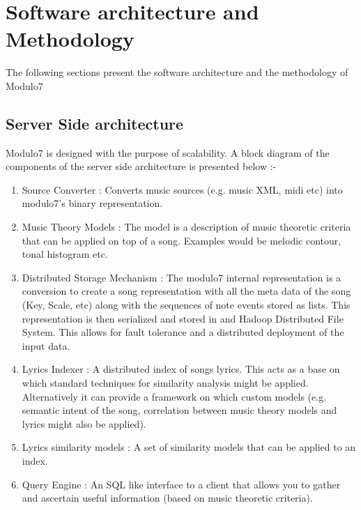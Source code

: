 \chapter{Software architecture and Methodology}
The following sections present the software architecture and the methodology of Modulo7
\section{Server Side architecture}
\noindent Modulo7 is designed with the purpose of scalability. A block diagram of the components of the server side architecture is presented below :-
\begin{enumerate}
\item Source Converter : Converts music sources (e.g. music XML, midi etc) into modulo7's binary representation.
\item Music Theory Models : The model is a description of music theoretic criteria that can be applied on top of a song. Examples would be melodic contour, tonal histogram etc. 
\item Distributed Storage Mechanism : The modulo7 internal representation is a conversion to create a song representation with all the meta data of the song (Key, Scale,  etc) along with the sequences of note events stored as lists. This representation is then serialized and stored in and Hadoop Distributed File System. This allows for fault tolerance and a distributed deployment of the input data.
\item Lyrics Indexer : A distributed index of songs lyrics. This acts as a base on which standard techniques for similarity analysis might be applied. Alternatively it can provide a framework on which custom models (e.g. semantic intent of the song, correlation between music theory models and lyrics might also be applied).  
\item Lyrics similarity models : A set of similarity models that can be applied to an index. 
\item Query Engine : An SQL like interface to a client that allows you to gather and ascertain useful information (based on music theoretic criteria). 
\end{enumerate}

